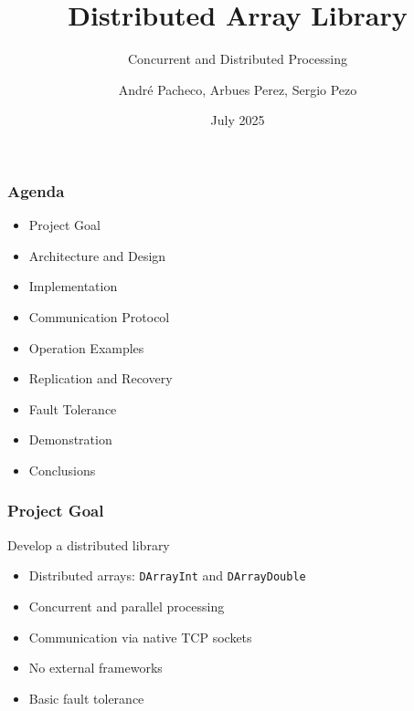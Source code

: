 \documentclass{beamer}
\title{Distributed Array Library}
\subtitle{Concurrent and Distributed Processing}
\author{André Pacheco, Arbues Perez, Sergio Pezo}
\date{July 2025}
\begin{document}
\maketitle

\begin{frame}
\frametitle{Agenda}
\begin{itemize}
    \item Project Goal
    \item Architecture and Design
    \item Implementation
    \item Communication Protocol
    \item Operation Examples
    \item Replication and Recovery
    \item Fault Tolerance
    \item Demonstration
    \item Conclusions
\end{itemize}
\end{frame}

\begin{frame}
\frametitle{Project Goal}
\begin{block}{Develop a distributed library}
    \begin{itemize}
        \item<1-> Distributed arrays: \texttt{DArrayInt} and \texttt{DArrayDouble}
        \item<2-> Concurrent and parallel processing
        \item<3-> Communication via native TCP sockets
        \item<4-> No external frameworks
        \item<5-> Basic fault tolerance
    \end{itemize}
\end{block}

\end{frame}
\end{document}
